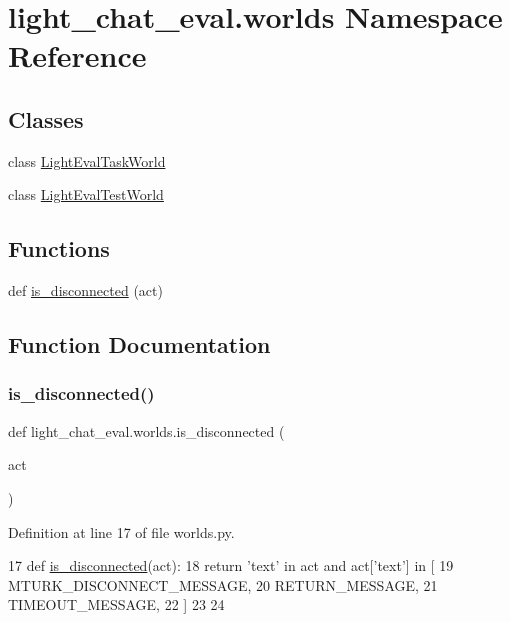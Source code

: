 \hypertarget{namespacelight__chat__eval_1_1worlds}{}\section{light\+\_\+chat\+\_\+eval.\+worlds Namespace Reference}
\label{namespacelight__chat__eval_1_1worlds}
\subsection*{Classes}
\begin{DoxyCompactItemize}
\item 
class \hyperlink{classlight__chat__eval_1_1worlds_1_1LightEvalTaskWorld}{Light\+Eval\+Task\+World}
\item 
class \hyperlink{classlight__chat__eval_1_1worlds_1_1LightEvalTestWorld}{Light\+Eval\+Test\+World}
\end{DoxyCompactItemize}
\subsection*{Functions}
\begin{DoxyCompactItemize}
\item 
def \hyperlink{namespacelight__chat__eval_1_1worlds_a0813e8622db7b552e60a63826daf8ace}{is\+\_\+disconnected} (act)
\end{DoxyCompactItemize}


\subsection{Function Documentation}
\mbox{\label{namespacelight__chat__eval_1_1worlds_a0813e8622db7b552e60a63826daf8ace}} 
\subsubsection{\texorpdfstring{is\+\_\+disconnected()}{is\_disconnected()}}
{\footnotesize\ttfamily def light\+\_\+chat\+\_\+eval.\+worlds.\+is\+\_\+disconnected (\begin{DoxyParamCaption}\item[{}]{act }\end{DoxyParamCaption})}



Definition at line 17 of file worlds.\+py.


\begin{DoxyCode}
17 \textcolor{keyword}{def }\hyperlink{namespacelight__chats_1_1worlds_a43b0aff73307cda95a089763b77f40d3}{is\_disconnected}(act):
18     \textcolor{keywordflow}{return} \textcolor{stringliteral}{'text'} \textcolor{keywordflow}{in} act \textcolor{keywordflow}{and} act[\textcolor{stringliteral}{'text'}] \textcolor{keywordflow}{in} [
19         MTURK\_DISCONNECT\_MESSAGE,
20         RETURN\_MESSAGE,
21         TIMEOUT\_MESSAGE,
22     ]
23 
24 
\end{DoxyCode}
